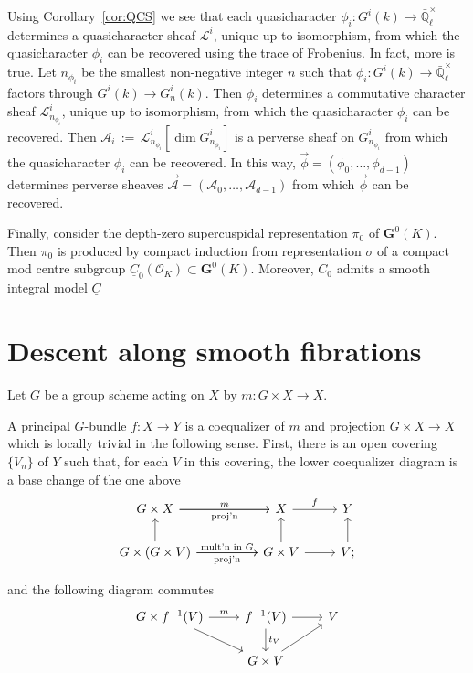 \documentclass[10pt]{amsart}
\theoremstyle{plain}
\theoremstyle{definition}
\newcommand{\EE}{\mathbb{\bar Q}_\ell}
\newcommand{\OK}{\mathcal{O}_K}
\newcommand{\Fq}{k}
\newcommand{\EEx}{\EE^\times}
\newcommand{\G}{\textbf{G}}
\newcommand{\ceq}{{\, :=\, }}
\newcommand{\cs}[1]{{\mathcal{#1}}}
\begin{document}
Using Corollary~\ref{cor:QCS} we see that each quasicharacter $\phi_i : G^i(\Fq) \to \EEx$ determines a quasicharacter sheaf $\cs{L}^i$, unique up to isomorphism, from which the quasicharacter $\phi_i$ can be recovered using the trace of Frobenius. 
In fact, more is true. Let $n_{\phi_i}$ be the smallest non-negative integer $n$ such that $\phi_i : G^i(\Fq) \to \EEx$ factors through $G^i(\Fq) \to G^i_n(\Fq)$.
Then $\phi_i$ determines a commutative character sheaf $\cs{L}_{n_{\phi_i}}^i$, unique up to isomorphism, from which the quasicharacter $\phi_i$ can be recovered.
Then $\cs{A}_i\ceq \cs{L}_{n_{\phi_i}}^i[\dim G_{n_{\phi_i}}^i]$ is a perverse sheaf on $G_{n_{\phi_i}}^i$ from which the quasicharacter $\phi_i$ can be recovered.
In this way,  $\vec{\phi} = (\phi_0, \ldots , \phi_{d-1})$ determines perverse sheaves $\vec{\cs{A}} = (\cs{A}_0, \ldots , \cs{A}_{d-1})$ from which $\vec{\phi}$ can be recovered. 

Finally, consider the depth-zero supercuspidal representation $\pi_0$ of $\G^0(K)$.
Then $\pi_0$ is produced by compact induction from representation $\sigma$ of a compact mod centre subgroup $\underline{C}_0(\OK) \subset \G^0(K)$. Moreover, $C_0$ admits a smooth integral model $\underline{C}$ 

\appendix

\section{Descent along smooth fibrations}

Let $G$ be a group scheme acting on $X$ by $m : G \times X \to X$.

A principal $G$-bundle $f : X\to Y$ is a coequalizer of $m$ and projection $G\times X \to X$  
which is locally trivial in the following sense.
First, there is an open covering $\{ V_n\}$ of $Y$ such that, for each $V$ in this covering, the lower coequalizer diagram is a base change of the one above
\[
\begin{tikzcd}
G\times X
 \arrow{rr}[shift left]{m}
  \arrow{rr}[shift right,swap]{\text{proj'n}}
&& X \arrow{r}{f} &  Y\\
G\times  (G\times V) \arrow{u}
 \arrow{rr}[shift left]{\text{mult'n in $G$}}
  \arrow{rr}[shift right,swap]{\text{proj'n}}
&& G\times V \arrow{u}  \arrow{r} &  \arrow{u} V;
\end{tikzcd}
\]

and the following diagram commutes
\[
\begin{tikzcd}
G\times  f^{-1}(V)
 \arrow{r}[shift left]{m}
  \arrow{dr} 
& f^{-1}(V) \arrow{r} \arrow{d}{t_V} &  V \\
& G\times V \arrow{ur} & 
\end{tikzcd}
\]
\end{document}

